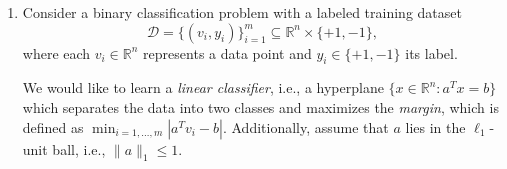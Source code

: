 \documentclass[11pt]{article}
\newcommand{\setR}{\mathbb{R}}
\renewcommand{\leq}{\leqslant}
\renewcommand{\geq}{\geqslant}
\begin{document}
\begin{enumerate}[1)]
\begin{solution}
Assume that $Ax \leq b$ actually has no solution. Now consider the matrix $\tilde{A} = \begin{pmatrix} A & -A & I_m\end{pmatrix}$ where the 3 matrices are concatenated and $I_m$ is the $m \times m$ identity matrix. Then clearly $\tilde{A}x= b$ has no solution $x \geq 0$ as if there was such a solution where $x = (u, v, s)$ for some $u \in \setR_{\geq 0}^n, v \in \setR_{\geq 0}^n, s \in \setR_{\geq 0}^m$, then we have that $Au - Av + s = b$ where $s \geq 0$ such that $A(u-v) \leq b$. This gives $(u-v) \in \setR^n$ as a solution to $Ax \leq b$ which is assumed not to exist. \\

Thus $\tilde{A}x = b$ has no solution $x \geq 0$ such that the standard Farkas lemma tells us that there exists some $\lambda \in \setR^m$ such that 
\begin{align*}
\lambda^Tb <0 \\
\lambda^T \tilde{A} \geq 0.
\end{align*}

Then 
\begin{align*}
\lambda^T \tilde{A} \geq 0 \\
\implies \lambda^T\begin{pmatrix} A & -A & I_m \end{pmatrix} \geq 0 \\
\implies \lambda^TA \geq 0, -\lambda^T A \geq 0, \lambda \geq 0 \\
\implies \lambda^T A = 0, \lambda \geq 0.
\end{align*}

Then $\lambda$ satisfies $\lambda^TA = 0, \lambda^T b < 0, \lambda \geq 0$ which is a contradiction to the assumption. So $Ax \leq b$ must have a solution. 

\end{solution}
  

\item Consider a binary classification problem with a labeled training dataset 
\[
\mathcal{D} = \{(v_i, y_i)\}_{i=1}^m \subseteq \mathbb{R}^n \times \{+1,-1\},
\]
where each $v_i \in \mathbb{R}^n$ represents a data point and $y_i \in \{+1,-1\}$ its label.

We would like to learn a \emph{linear classifier}, i.e., a hyperplane $\{x \in \mathbb{R}^n : a^T x = b\}$ which separates the data into two classes and maximizes the \emph{margin}, which is defined as $\min_{i=1,\ldots,m} |a^T v_i - b|$.
Additionally, assume that $a$ lies in the $\ell_1$-unit ball, i.e., $\|a\|_1 \leq 1$.


\end{enumerate}
\end{document}
